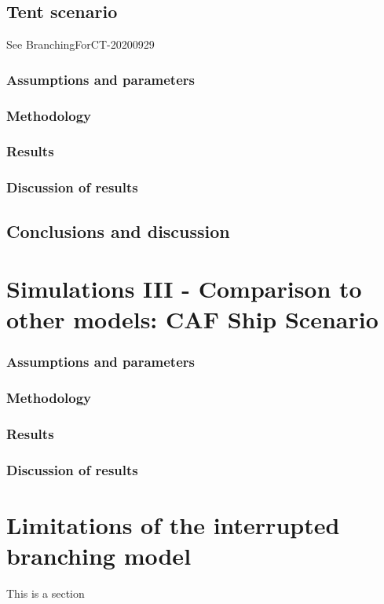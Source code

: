 \documentclass[sr]{drdc-report}
\begin{document}
\subsection{Tent scenario}
See BranchingForCT-20200929
\subsubsection{Assumptions and parameters}
\subsubsection{Methodology}
\subsubsection{Results}
\subsubsection{Discussion of results}


\subsection{Conclusions and discussion}

\section{Simulations III - Comparison to other models: CAF Ship Scenario}\label{section_ExpParams}
\subsubsection{Assumptions and parameters}
\subsubsection{Methodology}
\subsubsection{Results}
\subsubsection{Discussion of results}

\section{Limitations of the interrupted branching model}
This is a section
\end{document}
